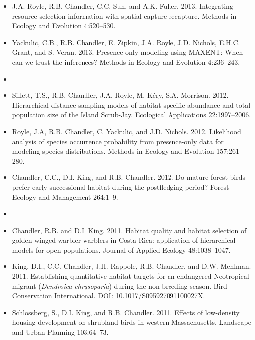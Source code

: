 \begin{itemize}
\item J.A. Royle, R.B. Chandler, C.C. Sun, and
  A.K. Fuller. 2013. Integrating resource selection information with
  spatial capture-recapture. Methods in Ecology and Evolution 4:520--530.

\item Yackulic, C.B., R.B. Chandler, E. Zipkin, J.A. Royle,
  J.D. Nichols, E.H.C. Grant, and S. Veran. 2013. Presence-only
  modeling using MAXENT: When can we trust the inferences? Methods in
  Ecology and Evolution 4:236--243. 

\item[] { \\}

\item Sillett, T.S., R.B. Chandler, J.A. Royle, M. K\'{e}ry,
  S.A. Morrison. 2012. Hierarchical distance sampling models of
  habitat-specific abundance and total population size of the Island
  Scrub-Jay. Ecological Applications 22:1997--2006.

\item Royle, J.A, R.B. Chandler, C. Yackulic, and
  J.D. Nichols. 2012. Likelihood analysis of species occurrence
  probability from presence-only data for modeling species
  distributions. Methods in Ecology and Evolution 157:261--280.

\item Chandler, C.C., D.I. King, and R.B. Chandler. 2012. Do mature
  forest birds prefer early-successional habitat
  during the postfledging period? Forest Ecology and Management 264:1--9.

\item[] { \\}

\item Chandler, R.B. and D.I. King. 2011. Habitat quality and
  habitat selection of golden-winged warbler warblers in Costa Rica:
  application of hierarchical models for open populations. Journal of
  Applied Ecology 48:1038--1047.

\item King, D.I., C.C. Chandler, J.H. Rappole, R.B. Chandler, and
  D.W. Mehlman. 2011. Establishing quantitative habitat targets
  for an endangered Neotropical migrant ({\it Dendroica chrysoparia})
  during the non-breeding season. Bird Conservation
  International. DOI: 10.1017/S095927091100027X.

\item Schlossberg, S., D.I. King, and R.B. Chandler. 2011. Effects
  of low-density housing development on shrubland birds
  in western Massachusetts. Landscape and Urban Planning 103:64--73.


\end{itemize}
